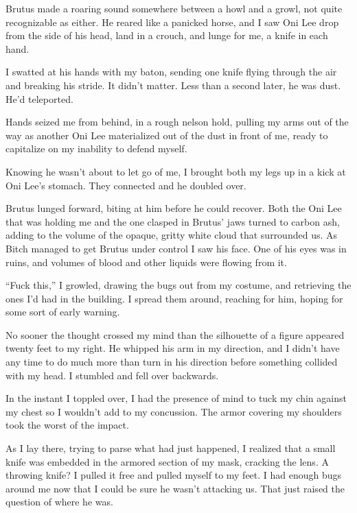 Brutus made a roaring sound somewhere between a howl and a growl, not quite recognizable as either.  He reared like a panicked horse, and I saw Oni Lee drop from the side of his head, land in a crouch, and lunge for me, a knife in each hand.



I swatted at his hands with my baton, sending one knife flying through the air and breaking his stride.  It didn't matter.  Less than a second later, he was dust.  He'd teleported.



Hands seized me from behind, in a rough nelson hold, pulling my arms out of the way as another Oni Lee materialized out of the dust in front of me, ready to capitalize on my inability to defend myself.



Knowing he wasn't about to let go of me, I brought both my legs up in a kick at Oni Lee's stomach.  They connected and he doubled over.



Brutus lunged forward, biting at him before he could recover.  Both the Oni Lee that was holding me and the one clasped in Brutus' jaws turned to carbon ash, adding to the volume of the opaque, gritty white cloud that surrounded us.  As Bitch managed to get Brutus under control I saw his face.  One of his eyes was in ruins, and volumes of blood and other liquids were flowing from it.



``Fuck this,'' I growled, drawing the bugs out from my costume, and retrieving the ones I'd had in the building.  I spread them around, reaching for him, hoping for some sort of early warning.



No sooner the thought crossed my mind than the silhouette of a figure appeared twenty feet to my right.  He whipped his arm in my direction, and I didn't have any time to do much more than turn in his direction before something collided with my head.  I stumbled and fell over backwards.



In the instant I toppled over, I had the presence of mind to tuck my chin against my chest so I wouldn't add to my concussion.  The armor covering my shoulders took the worst of the impact.



As I lay there, trying to parse what had just happened, I realized that a small knife was embedded in the armored section of my mask, cracking the lens.  A throwing knife?  I pulled it free and pulled myself to my feet.  I had enough bugs around me now that I could be sure he wasn't attacking us.  That just raised the question of where he was.



